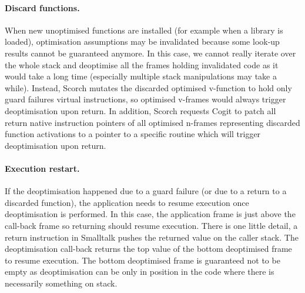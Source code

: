 \documentclass[a4paper,12pt,twoside]{../includes/ThesisStyle}
\begin{document}
\paragraph{Discard functions.} When new unoptimised functions are installed (for example when a library is loaded), optimisation assumptions may be invalidated because some look-up results cannot be guaranteed anymore. In this case, we cannot really iterate over the whole stack and deoptimise all the frames holding invalidated code as it would take a long time (especially multiple stack manipulations may take a while). Instead, Scorch mutates the discarded optimised v-function to hold only guard failures virtual instructions, so optimised v-frames would always trigger deoptimisation upon return. In addition, Scorch requests Cogit to patch all return native instruction pointers of all optimised n-frames representing discarded function activations to a pointer to a specific routine which will trigger deoptimisation upon return.

\paragraph{Execution restart.}

If the deoptimisation happened due to a guard failure (or due to a return to a discarded function), the application needs to resume execution once deoptimisation is performed. In this case, the application frame is just above the call-back frame so returning should resume execution. There is one little detail, a return instruction in Smalltalk pushes the returned value on the caller stack. The deoptimisation call-back returns the top value of the bottom deoptimised frame to resume execution. The bottom deoptimised frame is guaranteed not to be empty as deoptimisation can be only in position in the code where there is necessarily something on stack.


\end{document}
